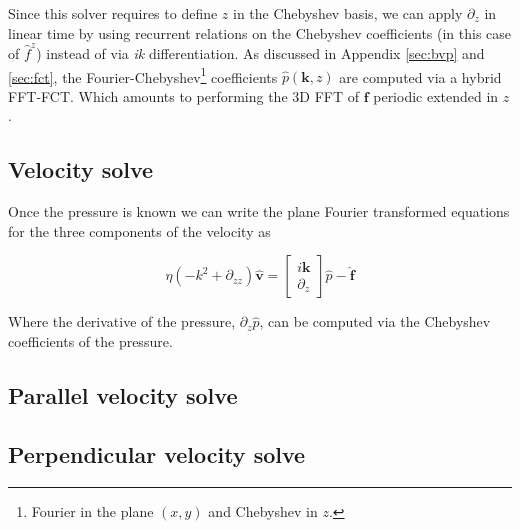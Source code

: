 \documentclass[ twoside,openright,titlepage,numbers=noenddot,%
headinclude,footinclude,cleardoublepage=empty,abstract=on,
BCOR=5mm,paper=a4,fontsize=11pt, dvipsnames
]{scrreprt}
\renewcommand{\vec}[1]{\bm{#1}}
\newcommand{\fou}[1]{\widehat{#1}}
\newcommand{\fvel}{v}
\begin{document}
Since this solver requires to define $z$ in the Chebyshev basis, we can apply $\partial_z$ in linear time by using recurrent relations on the Chebyshev coefficients (in this case of $\fou{f}^z$) instead of via \emph{ik} differentiation. As discussed in Appendix \ref{sec:bvp} and \ref{sec:fct}, the Fourier-Chebyshev\footnote{Fourier in the plane $(x,y)$ and Chebyshev in $z$.} coefficients $\fou{p}(\vec{k}, z)$ are computed via a hybrid \gls{FFT}-\gls{FCT}. Which amounts to performing the 3D \gls{FFT} of $\vec{f}$ periodic extended in $z$.

\subsection*{Velocity solve}
Once the pressure is known we can write the plane Fourier transformed equations for the three components of the velocity as

\begin{equation}
  \eta\left(-k^2 + \partial_{zz}\right)\fou{\vec{\fvel}} = 
  \begin{bmatrix}
    i\vec{k}\\
    \partial_z
  \end{bmatrix}
  \fou{p} -\fou{\vec{f}}
\end{equation}

Where the derivative of the pressure, $\partial_z\fou{p}$, can be computed via the Chebyshev coefficients of the pressure.
\subsection*{Parallel velocity solve}



\subsection*{Perpendicular velocity solve}
\end{document}
